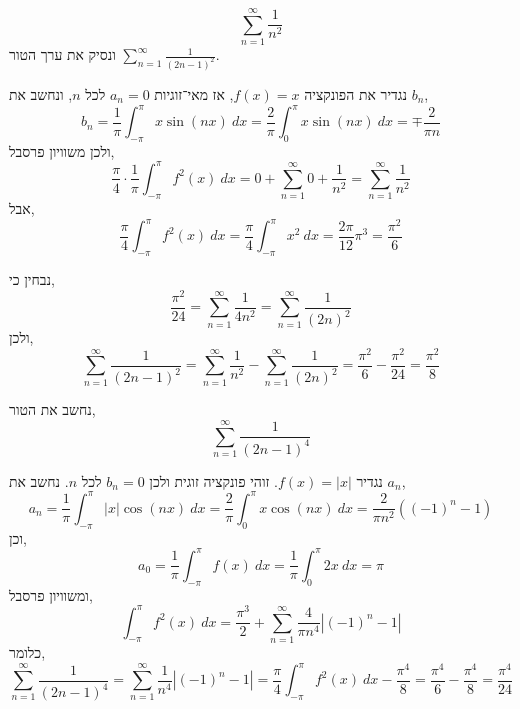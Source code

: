\subquestion{}
\[
	\sum_{n = 1}^\infty \frac{1}{n^2}
\]
ונסיק את ערך הטור $\sum_{n = 1}^\infty \frac{1}{{(2n - 1)}^2}$.
\begin{solution}
	נגדיר את הפונקציה $f(x) = x$,
	אז מאי־זוגיות $a_n = 0$ לכל $n$, ונחשב את $b_n$,
	\[
		b_n
		= \frac{1}{\pi} \int_{-\pi}^{\pi} x \sin(nx)\ dx
		= \frac{2}{\pi} \int_{0}^{\pi} x \sin(nx)\ dx
		= \mp \frac{2}{\pi n}
	\]
	ולכן משוויון פרסבל,
	\[
		\frac{\pi}{4} \cdot \frac{1}{\pi} \int_{-\pi}^{\pi} f^2(x)\ dx
		= 0 + \sum_{n = 1}^\infty 0 + \frac{1}{n^2}
		= \sum_{n = 1}^\infty \frac{1}{n^2}
	\]
	אבל,
	\[
		\frac{\pi}{4} \int_{-\pi}^{\pi} f^2(x)\ dx
		= \frac{\pi}{4} \int_{-\pi}^{\pi} x^2\ dx
		= \frac{2 \pi}{12} \pi^3
		= \frac{\pi^2}{6}
	\]

	נבחין כי,
	\[
		\frac{\pi^2}{24}
		= \sum_{n = 1}^\infty \frac{1}{4n^2}
		= \sum_{n = 1}^\infty \frac{1}{{(2n)}^2}
	\]
	ולכן,
	\[
		\sum_{n = 1}^\infty \frac{1}{{(2n - 1)}^2}
		= \sum_{n = 1}^\infty \frac{1}{n^2} - \sum_{n = 1}^\infty \frac{1}{{(2n)}^2}
		= \frac{\pi^2}{6} - \frac{\pi^2}{24}
		= \frac{\pi^2}{8}
	\]
\end{solution}

\subquestion{}
נחשב את הטור,
\[
	\sum_{n = 1}^\infty \frac{1}{{(2n - 1)}^4}
\]
\begin{solution}
	נגדיר $f(x) = |x|$.
	זוהי פונקציה זוגית ולכן $b_n = 0$ לכל $n$.
	נחשב את $a_n$,
	\[
		a_n
		= \frac{1}{\pi} \int_{-\pi}^{\pi} |x| \cos(nx)\ dx
		= \frac{2}{\pi} \int_{0}^{\pi} x \cos(nx)\ dx
		= \frac{2}{\pi n^2} ({(-1)}^n - 1)
	\]
	וכן,
	\[
		a_0
		= \frac{1}{\pi} \int_{-\pi}^{\pi} f(x)\ dx
		= \frac{1}{\pi} \int_{0}^{\pi} 2x\ dx
		= \pi
	\]
	ומשוויון פרסבל,
	\[
		\int_{-\pi}^{\pi} f^2(x)\ dx
		= \frac{\pi^3}{2} + \sum_{n = 1}^\infty \frac{4}{\pi n^4} |{(-1)}^n - 1|
	\]
	כלומר,
	\[
		\sum_{n = 1}^\infty \frac{1}{{(2n - 1)}^4}
		= \sum_{n = 1}^\infty \frac{1}{n^4} |{(-1)}^n - 1|
		= \frac{\pi}{4} \int_{-\pi}^{\pi} f^2(x)\ dx - \frac{\pi^4}{8}
		= \frac{\pi^4}{6} - \frac{\pi^4}{8}
		= \frac{\pi^4}{24}
	\]
\end{solution}

